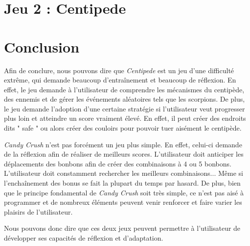 \documentclass[a4paper, 12pt, oneside]{article}
\newcommand{\oeuvre}[1]{\textit{#1}}
\newcommand{\Candy}{\oeuvre{Candy Crush}\xspace} %
\newcommand{\Centi}{\oeuvre{Centipede}\xspace}
\begin{document}
\section{Jeu 2 : Centipede}


\section{Conclusion}
Afin de conclure, nous pouvons dire que \Centi est un jeu d'une difficulté extrême, qui demande beaucoup d'entraînement et beaucoup de réflexion. En effet, le jeu demande à l'utilisateur de comprendre les mécanismes du centipède, des ennemis et de gérer les événements aléatoires tels que les scorpions. De plus, le jeu demande l'adoption d'une certaine stratégie si l'utilisateur veut progresser plus loin et atteindre un score vraiment élevé. En effet, il peut créer des endroits dits " safe " ou alors créer des couloirs pour pouvoir tuer aisément le centipède.

\Candy n'est pas forcément un jeu plus simple. En effet, celui-ci demande de la réflexion afin de réaliser de meilleurs scores. L'utilisateur doit anticiper les déplacements des bonbons afin de créer des combinaisons à 4 ou 5 bonbons.  L'utilisateur doit constamment rechercher les meilleurs combinaisons... Même si l'enchaînement des bonus se fait la plupart du temps par hasard. De plus, bien que le principe fondamental de \Candy soit très simple, ce n'est pas aisé à programmer et de nombreux éléments peuvent venir renforcer et faire varier les plaisirs de l'utilisateur. 

Nous pouvons donc dire que ces deux jeux peuvent permettre à l'utilisateur de développer ses capacités de réflexion et d'adaptation.
\end{document}
